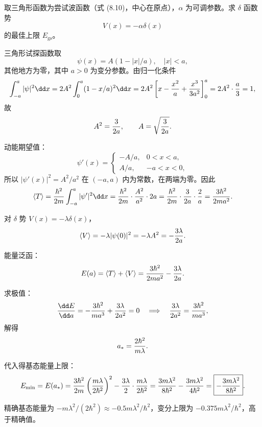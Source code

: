 \begin{question}
取三角形函数为尝试波函数（式 (8.10)，中心在原点），$\alpha$ 为可调参数。求 $\delta$ 函数势
\[
V(x)=-\alpha\delta(x)
\]
的最佳上限 $E_{\mathrm{gs}}$。

\par\smallskip
{}

\end{question}
\begin{solution}
三角形试探函数取
\[
\psi(x)=A(1-|x|/a),\quad |x|<a,
\]
其他地方为零，其中 $a>0$ 为变分参数。由归一化条件
\[
\int_{-a}^a|\psi|^2\dd x=2A^2\int_0^a(1-x/a)^2\dd x
=2A^2\left[x-{x^2\over a}+{x^3\over3a^2}\right]_0^a
=2A^2\cdot{a\over3}=1,
\]
故
\[
A^2={3\over2a},\qquad A=\sqrt{3\over2a}.
\]

动能期望值：
\[
\psi'(x)=\begin{cases}
-A/a, & 0<x<a,\\
A/a, & -a<x<0,
\end{cases}
\]
所以 $|\psi'(x)|^2=A^2/a^2$ 在 $(-a,a)$ 内为常数，在两端为零。因此
\[
\langle T\rangle={\hbar^2\over2m}\int_{-a}^a|\psi'|^2\dd x
={\hbar^2\over2m}\cdot{A^2\over a^2}\cdot 2a
={\hbar^2\over2m}\cdot{3\over2a}\cdot{2\over a}
={3\hbar^2\over2ma^2}.
\]

对 $\delta$ 势 $V(x)=-\lambda\delta(x)$，
\[
\langle V\rangle=-\lambda|\psi(0)|^2=-\lambda A^2=-{3\lambda\over2a}.
\]

能量泛函：
\[
E(a)=\langle T\rangle+\langle V\rangle
={3\hbar^2\over2ma^2}-{3\lambda\over2a}.
\]

求极值：
\[
{\dd E\over\dd a}=-{3\hbar^2\over ma^3}+{3\lambda\over2a^2}=0
\quad\Longrightarrow\quad
{3\lambda\over2a^2}={3\hbar^2\over ma^3},
\]
解得
\[
a_*={2\hbar^2\over m\lambda}.
\]

代入得基态能量上限：
\[
E_{\min}=E(a_*)={3\hbar^2\over2m}\left({m\lambda\over2\hbar^2}\right)^2
-{3\lambda\over2}\cdot{m\lambda\over2\hbar^2}
={3m\lambda^2\over8\hbar^2}-{3m\lambda^2\over4\hbar^2}
=\boxed{-{3m\lambda^2\over8\hbar^2}}.
\]

精确基态能量为 $-m\lambda^2/(2\hbar^2)\approx-0.5m\lambda^2/\hbar^2$，变分上限为 $-0.375m\lambda^2/\hbar^2$，高于精确值。
\end{solution}

